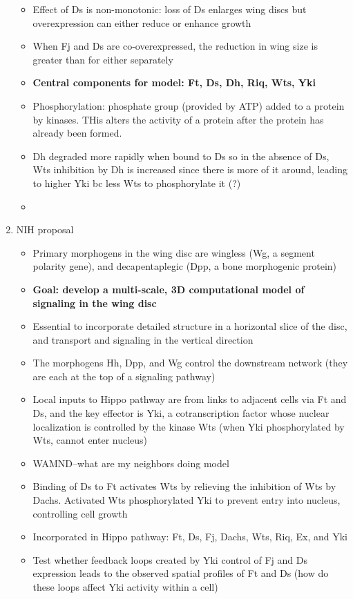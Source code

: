 \documentclass[12pt]{article}
\begin{document}
\begin{enumerate}
\begin{itemize}
	\item Effect of Ds is non-monotonic: loss of Ds enlarges wing discs but overexpression can either reduce or enhance growth 
	\item When Fj and Ds are co-overexpressed, the reduction in wing size is greater than for either separately
	\item \textbf{Central components for model: Ft, Ds, Dh, Riq, Wts, Yki}
	\item Phosphorylation: phosphate group (provided by ATP) added to a protein by kinases. THis alters the activity of a protein after the protein has already been formed. 
	\item Dh degraded more rapidly when bound to Ds so in the absence of Ds, Wts inhibition by Dh is increased since there is more of it around, leading to higher Yki bc less Wts to phosphorylate it (?)
	\item 
\end{itemize}

\item NIH proposal
\begin{itemize}
	\item Primary morphogens in the wing disc are wingless (Wg, a segment polarity gene), and decapentaplegic (Dpp, a bone morphogenic protein)
	\item \textbf{Goal: develop a multi-scale, 3D computational model of signaling in the wing disc}
	\item Essential to incorporate detailed structure in a horizontal slice of the disc, and transport and signaling in the vertical direction
	\item The morphogens Hh, Dpp, and Wg control the downstream network (they are each at the top of a signaling pathway)
	\item Local inputs to Hippo pathway are from links to adjacent cells via Ft and Ds, and the key effector is Yki, a cotranscription factor whose nuclear localization is controlled by the kinase Wts (when Yki phosphorylated by Wts, cannot enter nucleus)
	\item WAMND--what are my neighbors doing model
	\item Binding of Ds to Ft activates Wts by relieving the inhibition of Wts by Dachs. Activated Wts phosphorylated Yki to prevent entry into nucleus, controlling cell growth
	\item Incorporated in Hippo pathway: Ft, Ds, Fj, Dachs, Wts, Riq, Ex, and Yki
	\item Test whether feedback loops created by Yki control of Fj and Ds  expression leads to the observed spatial profiles of Ft and Ds (how do these loops affect Yki activity within a cell)


\end{itemize}
\end{enumerate}
\end{document}
